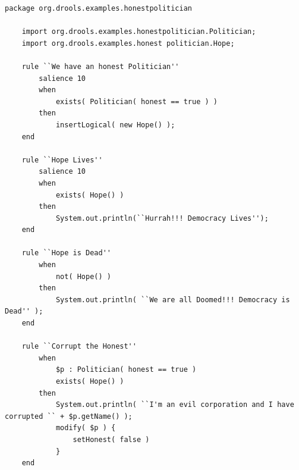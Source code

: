 \begin{lstlisting}[language={[drl]Drools}, caption=Example Drools file., captionpos=b, label=listing:drl_file]
    package org.drools.examples.honestpolitician
 
    import org.drools.examples.honestpolitician.Politician;
    import org.drools.examples.honest politician.Hope;
     
    rule ``We have an honest Politician''
        salience 10
        when
            exists( Politician( honest == true ) )
        then
            insertLogical( new Hope() );
    end
    
    rule ``Hope Lives''
        salience 10
        when
            exists( Hope() )
        then
            System.out.println(``Hurrah!!! Democracy Lives'');
    end
    
    rule ``Hope is Dead''
        when
            not( Hope() )
        then
            System.out.println( ``We are all Doomed!!! Democracy is Dead'' );
    end
    
    rule ``Corrupt the Honest''
        when
            $p : Politician( honest == true )   
            exists( Hope() )
        then
            System.out.println( ``I'm an evil corporation and I have corrupted `` + $p.getName() );
            modify( $p ) { 
                setHonest( false ) 
            }
    end
\end{lstlisting}

